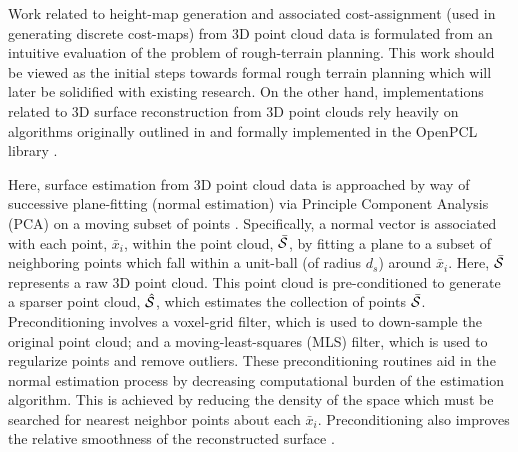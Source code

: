 		Work related to height-map generation and associated cost-assignment (used in generating discrete cost-maps) from 3D point cloud data is formulated from an intuitive evaluation of the problem of rough-terrain planning. This work should be viewed as the initial steps towards formal rough terrain planning which will later be solidified with existing research. On the other hand, implementations related to 3D surface reconstruction from 3D point clouds rely heavily on algorithms originally outlined in \cite{Rusu2009} and formally implemented in the OpenPCL library \cite{openpcl_library}. 

		Here, surface estimation from 3D point cloud data is approached by way of successive plane-fitting (normal estimation) via Principle Component Analysis (PCA) on a moving subset of points \cite{Rusu2009,Pearson1901}. Specifically, a normal vector is associated with each point, $\bar{x}_{i}$, within the point cloud,  $\bar{{\cal S}}$,  by fitting a plane to a subset of neighboring points which fall within a unit-ball (of radius $d_{s}$) around $\bar{x}_{i}$. Here, $\bar{{\cal S}}$ represents a raw 3D point cloud. This point cloud is pre-conditioned to generate a sparser point cloud, $\hat{{\cal S}}$, which estimates the collection of points $\bar{{\cal S}}$. Preconditioning involves a voxel-grid filter, which is used to down-sample the original point cloud; and a moving-least-squares (MLS) filter, which is used to regularize points and remove outliers. These preconditioning routines aid in the normal estimation process by decreasing computational burden of the estimation algorithm. This is achieved by reducing the density of the space which must be searched for nearest neighbor points about each $\bar{x}_{i}$. Preconditioning also improves the relative smoothness of the reconstructed surface \cite{Rusu2009}. 

